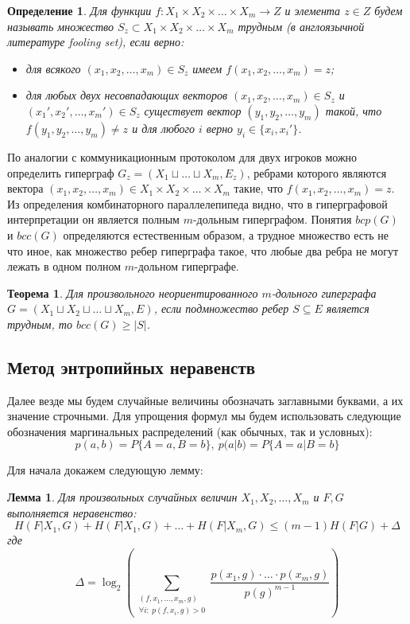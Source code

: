 \documentclass[a4paper]{article}
\newtheorem*{mdefinition}{Определение}
\newtheorem*{mlemma}{Лемма}
\newtheorem*{mtheorem}{Теорема}
\begin{document}
\begin{mdefinition}
	Для функции $f: X_1\times X_2\times\ldots\times X_m \rightarrow Z$ и элемента $z\in Z$ будем называть множество 
	$S_z\subset X_1\times X_2\times\ldots\times X_m$ трудным (в англоязычной литературе fooling set), если верно:
	\begin{itemize}[noitemsep]
		\item для всякого $(x_1, x_2, \ldots, x_m)\in S_z$ имеем $f(x_1, x_2, \ldots, x_m) = z$;
		\item для любых двух несовпадающих векторов $(x_1, x_2,\ldots, x_m)\in S_z$ и $(x_1', x_2',\ldots, x_m')\in S_z$ 
		существует вектор $(y_1, y_2,\ldots, y_m)$ такой, что $f(y_1, y_2,\ldots, y_m) \neq z$ и для любого 
		$i$ верно $y_i \in \{x_i, x_i'\}$.
	\end{itemize}
\end{mdefinition}

По аналогии с коммуникационным протоколом для двух игроков можно определить гиперграф 
$G_z = (X_1\sqcup\ldots\sqcup X_m, E_z)$, ребрами которого являются вектора $(x_1, x_2,\ldots, x_m) 
\in X_1\times X_2\times\ldots\times X_m$ такие, что $f(x_1, x_2,\ldots, x_m) = z$. Из определения 
комбинаторного параллелепипеда видно, что в гиперграфовой интерпретации он является полным $m$-дольным 
гиперграфом. Понятия $bcp(G)$ и $bcc(G)$ определяются естественным образом, а трудное множество есть 
не что иное, как множество ребер гиперграфа такое, что любые два ребра не могут лежать в одном полном $m$-дольном гиперграфе.  
	
\begin{mtheorem}
    Для произвольного неориентированного $m$-дольного гиперграфа $G = (X_1\sqcup X_2\sqcup\ldots\sqcup X_m, E)$, 
    если подмножество ребер $S \subseteq E$ является трудным, то $bcc(G) \geq |S|$.
\end{mtheorem}

\subsection{Метод энтропийных неравенств}

Далее везде мы будем случайные величины обозначать заглавными буквами, а их значение строчными. Для упрощения 
формул мы будем использовать следующие обозначения маргинальных распределений (как обычных, так и условных):
$$p(a,b) = P\{A=a, B=b\},\ p(a|b) = P\{A=a | B=b\}$$

Для начала докажем следующую лемму:
\begin{mlemma}
    Для произвольных случайных величин $X_1, X_2,\ldots, X_m$ и $F, G$ выполняется неравенство:
    $$H(F|X_1,G) + H(F|X_1,G) + \ldots + H(F|X_m,G) \leq (m-1)H(F|G) + \Delta$$ где 
    $$\Delta = \log_2\left(\sum\limits_{\substack{(f,x_1,\ldots,x_m,g) \\ \forall i:\ p(f,x_i,g)>0}}\frac{p(x_1,g)\cdot\ldots\cdot p(x_m,g)}{p(g)^{m-1}}\right)$$
\end{mlemma}
\end{document}
